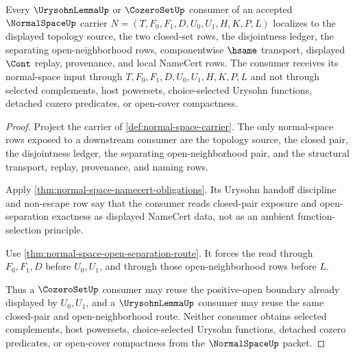 \begin{theorem}
\label{thm:normalspace-urysohn-cozero-localization}
Every $\UrysohnLemmaUp$ or $\CozeroSetUp$ consumer of an accepted $\NormalSpaceUp$ carrier $N=(T,F_0,F_1,D,U_0,U_1,H,K,P,L)$ localizes to the displayed topology source, the two closed-set rows, the disjointness ledger, the separating open-neighborhood rows, componentwise $\hsame$ transport, displayed $\Cont$ replay, provenance, and local NameCert rows. The consumer receives its normal-space input through $T,F_0,F_1,D,U_0,U_1,H,K,P,L$ and not through selected complements, host powersets, choice-selected Urysohn functions, detached cozero predicates, or open-cover compactness.
\end{theorem}
\begin{proof}
Project the carrier of \autoref{def:normal-space-carrier}. The only normal-space rows exposed to a downstream consumer are the topology source, the closed pair, the disjointness ledger, the separating open-neighborhood pair, and the structural transport, replay, provenance, and naming rows.

Apply \autoref{thm:normal-space-namecert-obligations}. Its Urysohn handoff discipline and non-escape row say that the consumer reads closed-pair exposure and open-separation exactness as displayed NameCert data, not as an ambient function-selection principle.

Use \autoref{thm:normal-space-open-separation-route}. It forces the read through $F_0,F_1,D$ before $U_0,U_1$, and through those open-neighborhood rows before $L$.

Thus a $\CozeroSetUp$ consumer may reuse the positive-open boundary already displayed by $U_0,U_1$, and a $\UrysohnLemmaUp$ consumer may reuse the same closed-pair and open-neighborhood route. Neither consumer obtains selected complements, host powersets, choice-selected Urysohn functions, detached cozero predicates, or open-cover compactness from the $\NormalSpaceUp$ packet.
\end{proof}


